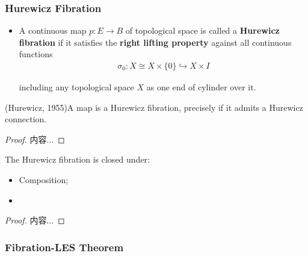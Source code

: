 \documentclass[Total.tex]{subfiles}
\begin{document}
				\subsubsection{Hurewicz Fibration}
				\begin{Def}
					\begin{itemize}
						\item A continuous map $p:E\rightarrow B$ of topological space is called a \textbf{Hurewicz fibration} if it satisfies the \textbf{right lifting property} against all continuous functions
						\begin{gather*}
							\sigma_0:X\cong X\times\{0\}\hookrightarrow X\times I
						\end{gather*}
						
						including any topological space $X$ as one end of cylinder over it.
						
						\begin{center}
						\end{center}
					\end{itemize}
				\end{Def}
				
				\begin{theorem}
					(Hurewicz, 1955)A map is a Hurewicz fibration, precisely if it admits a Hurewicz connection.
				\end{theorem}
				\begin{proof}
					内容...
				\end{proof}
				
				\begin{proposition}
					The Hurewicz fibration is closed under:
					\begin{itemize}
						\item Composition;
						\item 
					\end{itemize}
				\end{proposition}
				\begin{proof}
					内容...
				\end{proof}
				
				\subsubsection{Fibration-LES Theorem}
				
\end{document}
